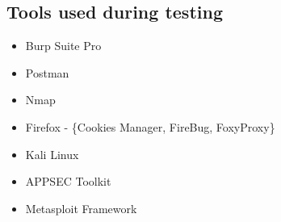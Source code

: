 \subsection{Tools used during testing}
\begin{itemize}[noitemsep]
\item Burp Suite Pro
\item Postman
\item Nmap
\item Firefox - \{Cookies Manager, FireBug, FoxyProxy\}
\item Kali Linux
\item APPSEC Toolkit
\item Metasploit Framework
\end{itemize}

